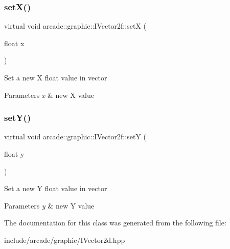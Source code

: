 \subsubsection{\texorpdfstring{setX()}{setX()}}
{\footnotesize\ttfamily virtual void arcade\+::graphic\+::\+I\+Vector2f\+::setX (\begin{DoxyParamCaption}\item[{float}]{x }\end{DoxyParamCaption})\hspace{0.3cm}{\ttfamily [pure virtual]}}

Set a new X float value in vector 
\begin{DoxyParams}{Parameters}
{\em x} & new X value \\
\hline
\end{DoxyParams}
\mbox{\label{classarcade_1_1graphic_1_1_i_vector2f_ad10b9e1e6d0481c15678bb5ec61916bf}} 
\subsubsection{\texorpdfstring{setY()}{setY()}}
{\footnotesize\ttfamily virtual void arcade\+::graphic\+::\+I\+Vector2f\+::setY (\begin{DoxyParamCaption}\item[{float}]{y }\end{DoxyParamCaption})\hspace{0.3cm}{\ttfamily [pure virtual]}}

Set a new Y float value in vector 
\begin{DoxyParams}{Parameters}
{\em y} & new Y value \\
\hline
\end{DoxyParams}


The documentation for this class was generated from the following file\+:\begin{DoxyCompactItemize}
\item 
include/arcade/graphic/I\+Vector2d.\+hpp\end{DoxyCompactItemize}
